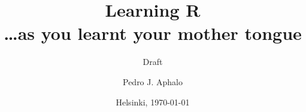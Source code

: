 \documentclass[paper=a4,10pt,div=17,headsepline,BCOR=12mm,twoside,open=right]{scrbook}\usepackage{knitr}
\begin{document}
\extratitle{\vspace*{4\baselineskip}%
             {\Huge\textsf{\textbf{Learning R}\\ \textsl{\ldots as you learnt your mother tongue}}}}

\subject{\sf Department of Biosciences, University of Helsinki}

\title{\Huge{\sffamily Learning R\\{\large\ldots as you learnt your mother tongue}}}

\subtitle{Draft}

\author{Pedro J. Aphalo}

\date{Helsinki, \today}

\publishers{Unpublished}

\uppertitleback{This file includes only some of the chapters to be included when complete.}


\lowertitleback{Typeset with \href{http://www.latex-project.org/}{\LaTeX}\ in Lucida Bright and \textsf{Lucida Sans} using the KOMA-Script book class.\\
                The manuscript was written using \href{http://www.r-project.org/}{R} with package knitr and several other packages used in different chapters, where they are listed. The manuscript was edited in \href{http://www.winedt.com/}{WinEdt} and \href{http://www.rstudio.com/}{RStudio}.}

\frontmatter












\maketitle


\tableofcontents



\end{document}
